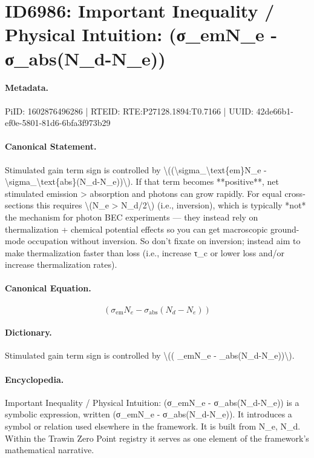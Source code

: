 \section*{ID6986: Important Inequality / Physical Intuition: (σ\_emN\_e - σ\_abs(N\_d-N\_e))}
\paragraph{Metadata.}
PiID: 1602876496286 | RTEID: RTE:P27128.1894:T0.7166 | UUID: 42de66b1-ef0e-5801-81d6-6bfa3f973b29

\paragraph{Canonical Statement.}
Stimulated gain term sign is controlled by \textbackslash{}((\textbackslash{}sigma\_\textbackslash{}text\{em\}N\_e - \textbackslash{}sigma\_\textbackslash{}text\{abs\}(N\_d-N\_e))\textbackslash{}). If that term becomes **positive**, net stimulated emission > absorption and photons can grow rapidly. For equal cross-sections this requires \textbackslash{}(N\_e > N\_d/2\textbackslash{}) (i.e., inversion), which is typically *not* the mechanism for photon BEC experiments — they instead rely on thermalization + chemical potential effects so you can get macroscopic ground-mode occupation without inversion. So don’t fixate on inversion; instead aim to make thermalization faster than loss (i.e., increase τ\_c or lower loss and/or increase thermalization rates).

\paragraph{Canonical Equation.}
\[
(\sigma_\text{em}N_e - \sigma_\text{abs}(N_d-N_e))
\]

\paragraph{Dictionary.}
Stimulated gain term sign is controlled by \textbackslash{}(( \_emN\_e - \_abs(N\_d-N\_e))\textbackslash{}).

\paragraph{Encyclopedia.}
Important Inequality / Physical Intuition: (σ\_emN\_e - σ\_abs(N\_d-N\_e)) is a symbolic expression, written (σ\_emN\_e - σ\_abs(N\_d-N\_e)). It introduces a symbol or relation used elsewhere in the framework. It is built from N\_e, N\_d. Within the Trawin Zero Point registry it serves as one element of the framework's mathematical narrative.
